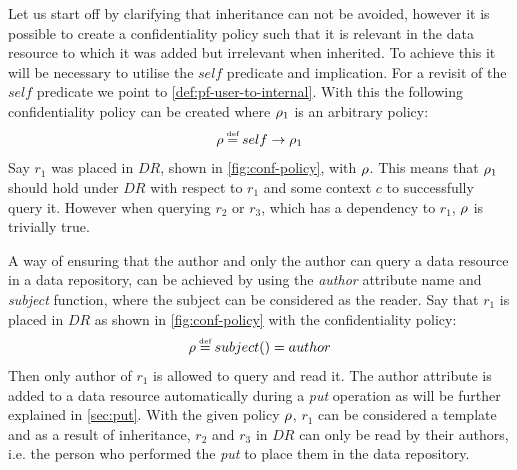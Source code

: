 \begin{example}\label{ex:avoid}
Let us start off by clarifying that inheritance can not be avoided, however it is possible to create a confidentiality policy such that it is relevant in the data resource to which it was added but irrelevant when inherited. To achieve this it will be necessary to utilise the $self$ predicate and implication. For a revisit of the $self$ predicate we point to \autoref{def:pf-user-to-internal}. With this the following confidentiality policy can be created where $\rho_1$ is an arbitrary policy:
\begin{align*}
    \conf \eqdef self \imply \conf_1
\end{align*}
Say $r_1$ was placed in $DR$, shown in \autoref{fig:conf-policy}, with $\rho$. This means that $\rho_1$ should hold under $DR$ with respect to $r_1$ and some context $c$ to successfully query it. However when querying $r_2$ or $r_3$, which has a dependency to $r_1$, $\rho$ is trivially true.
\end{example}

\begin{example}\label{ex:conf-reader-author}
A way of ensuring that the author and only the author can query a data resource in a data repository, can be achieved by using the \emph{author} attribute name and \emph{subject} function, where the subject can be considered as the reader. Say that $r_1$ is placed in $DR$ as shown in \autoref{fig:conf-policy} with the confidentiality policy:
\begin{align*}
    \conf \eqdef subject() = author
\end{align*}
Then only author of $r_1$ is allowed to query and read it. The author attribute is added to a data resource automatically during a \emph{put} operation as will be further explained in \autoref{sec:put}. With the given policy $\rho$, $r_1$ can be considered a template and as a result of inheritance, $r_2$ and $r_3$ in $DR$ can only be read by their authors, i.e. the person who performed the \emph{put} to place them in the data repository.
\end{example}

